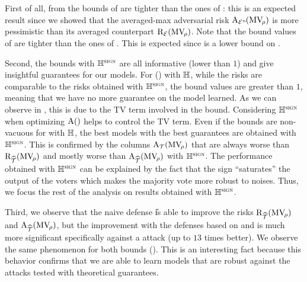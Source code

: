 First of all, from  the bounds of  are tighter than the ones of : this is an expected result since we showed  that the averaged-max adversarial risk $\text{A}_{{\mathcal{E}}^{n\!}}(\text{MV}_{\!\rho})$ is more pessimistic than its averaged counterpart $\text{R}_{{\mathcal{E}}}(\text{MV}_{\!\rho})$.
Note that the bound values of  are tighter than the ones of .
This is expected since  is a lower bound on .

Second, the bounds with $\mathbb{H}^{\text{{\sc sign}}}$ are all informative (lower than $1$) and give insightful guarantees for our models.
For  () with $\mathbb{H}$, while the risks are comparable to the risks obtained with $\mathbb{H}^{\text{{\sc sign}}}$, the bound values are greater than $1$, meaning that we have no more guarantee on the model learned. 
As we can observe in , this is due to the TV term involved in the bound. 
Considering $\mathbb{H}^{\text{{\sc sign}}}$ when optimizing $\text{A}()$ helps to control the TV term. 
Even if the bounds are non-vacuous for  with $\mathbb{H}$, the best models with the best guarantees are obtained with $\mathbb{H}^{\text{{\sc sign}}}$.
This is confirmed by the columns $\text{A}_{\mathcal{T}}(\text{MV}_{\!\rho})$ that are always worse than $\text{R}_{\widehat{\mathcal{T}}}(\text{MV}_{\!\rho})$ and mostly worse than $\text{A}_{\widehat{\mathcal{T}}}(\text{MV}_{\!\rho})$ with $\mathbb{H}^{\text{{\sc sign}}}$.
The performance obtained with $\mathbb{H}^{\text{{\sc sign}}}$ can be explained by the fact that the sign ``saturates'' the output of the voters which makes the majority vote more robust to noises.
Thus, we focus the rest of the analysis on results obtained with $\mathbb{H}^{\text{{\sc sign}}}$.

Third, we observe that the naive defense \U is able to improve the risks $\text{R}_{\widehat{\mathcal{T}}}(\text{MV}_{\!\rho})$ and $\text{A}_{\widehat{\mathcal{T}}}(\text{MV}_{\!\rho})$, but the improvement with the defenses based on \PGDU and \IFGSMU is much more significant specifically against a \PGDU attack (up to $13$ times better).
We observe the same phenomenon for both bounds ().
This is an interesting fact because this behavior  confirms that we are able to learn models that are robust against the attacks tested with theoretical guarantees.

